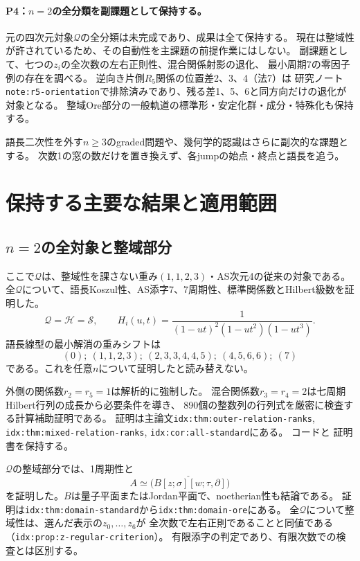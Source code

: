 \documentclass[11pt,a4paper]{ltjsarticle}
\begin{document}
\paragraph{P4：$n=2$の全分類を副課題として保持する。}
元の四次元対象$\mathcal Q$の全分類は未完成であり、成果は全て保持する。
現在は整域性が許されているため、その自動性を主課題の前提作業にはしない。
副課題として、七つの$z_i$の全次数の左右正則性、混合関係射影の退化、
最小周期7の零因子例の存在を調べる。
逆向き片側$R_5$関係の位置差2、3、4（法7）は
研究ノート\texttt{note:r5-orientation}で排除済みであり、残る差1、5、6と同方向だけの退化が対象となる。
整域Ore部分の一般軌道の標準形・安定化群・成分・特殊化も保持する。

語長二次性を外す$n\geq3$のgraded問題や、幾何学的認識はさらに副次的な課題とする。
次数1の窓の数だけを置き換えず、各jumpの始点・終点と語長を追う。

\section{保持する主要な結果と適用範囲}
\subsection{\texorpdfstring{$n=2$}{n=2}の全対象と整域部分}
ここで$\mathcal Q$は、整域性を課さない重み$(1,1,2,3)$・AS次元4の従来の対象である。
全$\mathcal Q$について、語長Koszul性、AS添字7、7周期性、標準関係数とHilbert級数を証明した。
\[
\mathcal Q=\mathcal H=\mathcal S,\qquad
H_i(u,t)=\frac{1}{(1-ut)^2(1-ut^2)(1-ut^3)}.
\]
語長線型の最小解消の重みシフトは
\[
(0);\ (1,1,2,3);\ (2,3,3,4,4,5);\ (4,5,6,6);\ (7)
\]
である。これを任意$n$について証明したと読み替えない。

外側の関係数$r_2=r_5=1$は解析的に強制した。
混合関係数$r_3=r_4=2$は七周期Hilbert行列の成長から必要条件を導き、
890個の整数列の行列式を厳密に検査する計算補助証明である。
証明は主論文\texttt{idx:thm:outer-relation-ranks},
\texttt{idx:thm:mixed-relation-ranks}, \texttt{idx:cor:all-standard}にある。
コードと
証明書を保持する。

$\mathcal Q$の整域部分では、1周期性と
\[
A\simeq\check{\bigl(B[z;\sigma][w;\tau,\partial]\bigr)}
\]
を証明した。$B$は量子平面またはJordan平面で、noetherian性も結論である。
証明は\texttt{idx:thm:domain-standard}から\texttt{idx:thm:domain-ore}にある。
全$\mathcal Q$について整域性は、選んだ表示の$z_0,\ldots,z_6$が
全次数で左右正則であることと同値である（\texttt{idx:prop:z-regular-criterion}）。
有限添字の判定であり、有限次数での検査とは区別する。
\end{document}
